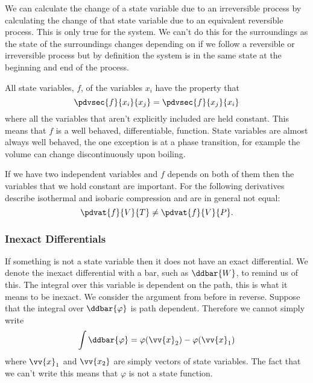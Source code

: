     We can calculate the change of a state variable due to an irreversible process by calculating the change of that state variable due to an equivalent reversible process.
    This is only true for the system.
    We can't do this for the surroundings as the state of the surroundings changes depending on if we follow a reversible or irreversible process but by definition the system is in the same state at the beginning and end of the process.
    
    All state variables, \(f\), of the variables \(x_i\) have the property that
    \[\pdvsec{f}{x_i}{x_j} = \pdvsec{f}{x_j}{x_i}\]
    where all the variables that aren't explicitly included are held constant.
    This means that \(f\) is a well behaved, differentiable, function.
    State variables are almost always well behaved, the one exception is at a phase transition, for example the volume can change discontinuously upon boiling.
    
    If we have two independent variables and \(f\) depends on both of them then the variables that we hold constant are important.
    For the following derivatives describe isothermal and isobaric compression and are in general not equal:
    \[\pdvat{f}{V}{T} \ne \pdvat{f}{V}{P}.\]
    
    \subsubsection{Inexact Differentials}
    If something is not a state variable then it does not have an exact differential.
    We denote the inexact differential with a bar, such as \(\ddbar{W}\), to remind us of this.
    The integral over this variable is dependent on the path, this is what it means to be inexact.
    We consider the argument from before in reverse.
    Suppose that the integral over \(\ddbar{\varphi}\) is path dependent.
    Therefore we cannot simply write
    \[\int\ddbar{\varphi} = \varphi(\vv{x}_2) - \varphi(\vv{x}_1)\]
    where \(\vv{x}_1\) and \(\vv{x_2}\) are simply vectors of state variables.
    The fact that we can't write this means that \(\varphi\) is not a state function.
    
